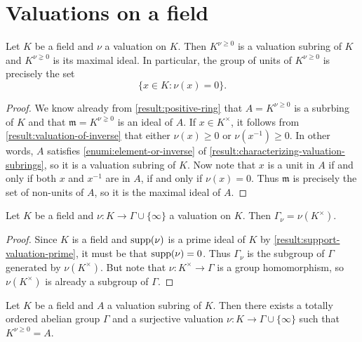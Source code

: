 
\section{Valuations on a field}

\begin{lemma}
\label{result:valuation-field-valuation-subring}
Let $K$ be a field and $\nu$ a valuation on $K$. Then $K^{\nu \geq 0}$ is a valuation subring of $K$ and $K^{\nu \gneq 0}$ is its maximal ideal. In particular, the group of units of $K^{\nu \geq 0}$ is precisely the set
\[ \{ x \in K : \nu(x) = 0 \}. \]
\end{lemma}

\begin{proof}
We know already from \cref{result:positive-ring} that $A = K^{\nu \geq 0}$ is a subrbing of $K$ and that $\mathfrak{m} = K^{\nu \gneq 0}$ is an ideal of $A$. If $x \in K^\times$, it follows from \cref{result:valuation-of-inverse} that either $\nu(x) \geq 0$ or $\nu(x^{-1}) \geq 0$. In other words, $A$ satisfies \cref{enumi:element-or-inverse} of \cref{result:characterizing-valuation-subrings}, so it is a valuation subring of $K$. Now note that $x$ is a unit in $A$ if and only if both $x$ and $x^{-1}$ are in $A$, if and only if $\nu(x) = 0$. Thus $\mathfrak{m}$ is precisely the set of non-units of $A$, so it is the maximal ideal of $A$. 
\end{proof}

\begin{lemma}
Let $K$ be a field and $\nu : K \to \Gamma \cup \{\infty\}$ a valuation on $K$. Then $\Gamma_\nu = \nu(K^\times)$. 
\end{lemma}

\begin{proof}
Since $K$ is a field and $\operatorname{supp}(\nu)$ is a prime ideal of $K$ by \cref{result:support-valuation-prime}, it must be that $\operatorname{supp}(\nu) = 0$. Thus $\Gamma_\nu$ is the subgroup of $\Gamma$ generated by $\nu(K^\times)$. But note that $\nu : K^\times \to \Gamma$ is a group homomorphism, so $\nu(K^\times)$ is already a subgroup of $\Gamma$. 
\end{proof}

\begin{lemma}
Let $K$ be a field and $A$ a valuation subring of $K$. Then there exists a totally ordered abelian group $\Gamma$ and a surjective valuation $\nu : K \to \Gamma \cup \{\infty\}$ such that $K^{\nu \geq 0} = A$. 
\end{lemma}

